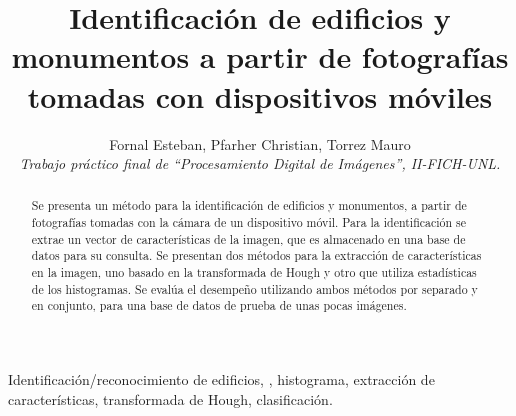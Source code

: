 \documentclass[conference,spanish,a4paper,10pt,oneside,final]{tfmpd}
\begin{document}
\title{Identificación de edificios y monumentos a partir de fotografías
tomadas con dispositivos móviles}
\author{Fornal Esteban, Pfarher Christian, Torrez Mauro\\
\textit{Trabajo práctico final de ``Procesamiento Digital de
Imágenes'', II-FICH-UNL.}}
\maketitle
%
%
%
%
\begin{abstract}
Se presenta un método para la identificación de edificios y monumentos, a
partir de fotografías tomadas con la cámara de un dispositivo móvil.
Para la identificación se extrae un vector de características de la imagen,
que es almacenado en una base de datos para su consulta.
Se presentan dos métodos para la extracción de características en la imagen, uno
basado en la transformada de Hough y otro que utiliza estadísticas de los
histogramas. Se evalúa el desempeño utilizando ambos métodos por separado y en
conjunto, para una base de datos de prueba de unas pocas imágenes.
\end{abstract}
%
%
%
%
\begin{keywords}
Identificación/reconocimiento de edificios, ,
histograma, extracción de características, transformada de Hough, clasificación.
\end{keywords}
%
%
%
%
\end{document}
